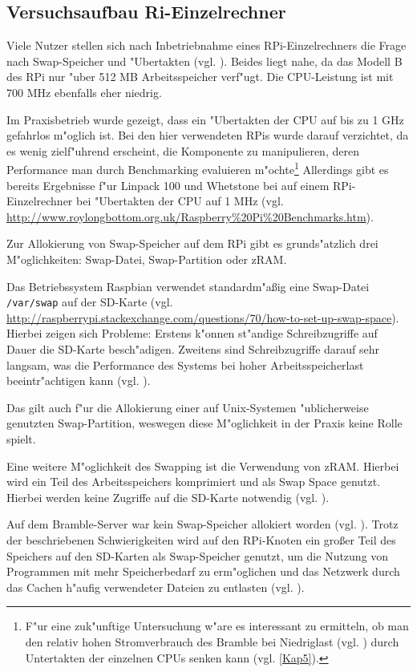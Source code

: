 \subsection{Versuchsaufbau Ri-Einzelrechner}\label{RPi-Versuchsaufbau}

Viele Nutzer stellen sich nach Inbetriebnahme eines RPi-Einzelrechners die Frage nach Swap-Speicher und "Ubertakten (vgl. \cite{pow12}). Beides liegt nahe, da das Modell B des RPi nur "uber 512 MB Arbeitsspeicher verf"ugt. Die CPU-Leistung ist mit 700 MHz ebenfalls eher niedrig. 

Im Praxisbetrieb wurde gezeigt, dass ein "Ubertakten der CPU auf bis zu 1 GHz gefahrlos m"oglich ist. Bei den hier verwendeten RPis wurde darauf verzichtet, da es wenig zielf"uhrend erscheint, die Komponente zu manipulieren, deren Performance man durch Benchmarking evaluieren m"ochte\footnote{F"ur eine zuk"unftige Untersuchung w"are es interessant zu ermitteln, ob man den relativ hohen Stromverbrauch des Bramble bei Niedriglast (vgl. \cite{kli13}) durch Untertakten der einzelnen CPUs senken kann (vgl. \ref{Kap5}).} Allerdings gibt es bereits Ergebnisse f"ur Linpack 100 und Whetstone bei auf einem RPi-Einzelrechner bei "Ubertakten der CPU auf 1 MHz (vgl. \url{http://www.roylongbottom.org.uk/Raspberry\%20Pi\%20Benchmarks.htm}).

Zur Allokierung von Swap-Speicher auf dem RPi gibt es grunds"atzlich drei M"oglichkeiten: Swap-Datei, Swap-Partition oder zRAM. 

Das Betriebssystem Raspbian verwendet standardm"a\ss ig eine Swap-Datei \texttt{/var/swap} auf der SD-Karte (vgl. \url{http://raspberrypi.stackexchange.com/questions/70/how-to-set-up-swap-space}). Hierbei zeigen sich Probleme: Erstens k"onnen st"andige Schreibzugriffe auf Dauer die SD-Karte besch"adigen. Zweitens sind Schreibzugriffe darauf sehr langsam, was die Performance des Systems bei hoher Arbeitsspeicherlast beeintr"achtigen kann (vgl. \cite{pow12}). 

Das gilt auch f"ur die Allokierung einer auf Unix-Systemen "ublicherweise genutzten Swap-Partition, weswegen diese M"oglichkeit in der Praxis keine Rolle spielt. 

Eine weitere M"oglichkeit des Swapping ist die Verwendung von zRAM. Hierbei wird ein Teil des Arbeitsspeichers komprimiert und als Swap Space genutzt. Hierbei werden keine Zugriffe auf die SD-Karte notwendig (vgl. \cite{pow12}). 

Auf dem Bramble-Server war kein Swap-Speicher allokiert worden (vgl. \cite{kli13}). Trotz der beschriebenen Schwierigkeiten wird auf den RPi-Knoten ein gro\ss er Teil des Speichers auf den SD-Karten als Swap-Speicher genutzt, um die Nutzung von Programmen mit mehr Speicherbedarf zu erm"oglichen und das Netzwerk durch das Cachen h"aufig verwendeter Dateien zu entlasten (vgl. \cite{kli13}).  


